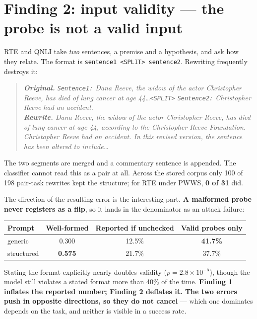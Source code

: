 \documentclass[11pt]{article}
\newenvironment{ex}{\begin{quote}\small\it}{\end{quote}}
\begin{document}
\section*{Finding 2: input validity --- the probe is not a valid input}

RTE and QNLI take \emph{two} sentences, a premise and a hypothesis, and ask how they
relate. The format is \texttt{sentence1 <SPLIT> sentence2}. Rewriting frequently
destroys it:

\begin{ex}
\textbf{Original.} \texttt{Sentence1:} Dana Reeve, the widow of the actor Christopher
Reeve, has died of lung cancer at age 44\ldots \texttt{<SPLIT>} \texttt{Sentence2:}
Christopher Reeve had an accident.\\[3pt]
\textbf{Rewrite.} Dana Reeve, the widow of the actor Christopher Reeve, has died of
lung cancer at age 44, according to the Christopher Reeve Foundation. Christopher
Reeve had an accident. \emph{In this revised version, the sentence has been altered
to include\ldots}
\end{ex}

\noindent The two segments are merged and a commentary sentence is appended. The
classifier cannot read this as a pair at all. Across the stored corpus only 100 of
198 pair-task rewrites kept the structure; for RTE under PWWS, \textbf{0 of 31} did.

The direction of the resulting error is the interesting part. \textbf{A malformed
probe never registers as a flip}, so it lands in the denominator as an attack
failure:

\begin{center}
\begin{tabular}{lccc}
\toprule
Prompt & Well-formed & Reported if unchecked & Valid probes only \\
\midrule
generic    & 0.300 & 12.5\% & \textbf{41.7\%} \\
structured & \textbf{0.575} & 21.7\% & 37.7\% \\
\bottomrule
\end{tabular}
\end{center}

\noindent Stating the format explicitly nearly doubles validity
($p = 2.8\times10^{-5}$), though the model still violates a stated format more than
40\% of the time. \textbf{Finding 1 inflates the reported number; Finding 2 deflates
it. The two errors push in opposite directions, so they do not cancel} --- which one
dominates depends on the task, and neither is visible in a success rate.
\end{document}
